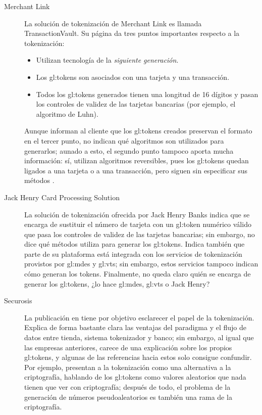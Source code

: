 \begin{description}
  \item[Merchant Link]
    La solución de tokenización de Merchant Link es llamada TransactionVault. Su
    página da tres puntos importantes respecto a la tokenización:
    \begin{itemize}
      \item Utilizan tecnología de la \textit{siguiente generación}.
      \item Los \glspl{gl:token} son asociados con una tarjeta y una
        transacción.
      \item Todos los \glspl{gl:token} generados tienen una longitud de 16
        dígitos y pasan los controles de validez de las tarjetas bancarias
        (por ejemplo, el algoritmo de Luhn).
      \end{itemize}
      Aunque informan al cliente que los \glspl{gl:token} creados preservan el
      formato en el tercer punto, no indican qué algoritmos son utilizados para
      generarlos; aunado a esto, el segundo punto tampoco aporta mucha
      información: sí, utilizan algoritmos reversibles, pues los
      \glspl{gl:token} quedan ligados a una tarjeta o a una transacción,
      pero siguen sin especificar sus métodos \cite{merchant_link}.

    \item[Jack Henry Card Processing Solution]
      La solución de tokenización ofrecida por Jack Henry Banks indica que se
      encarga de sustituir el número de tarjeta con un \gls{gl:token} numérico
      válido que pasa los controles de validez  de las tarjetas bancarias; sin
      embargo, no dice qué métodos utiliza para generar los \glspl{gl:token}.
      Indica también que parte de su plataforma está integrada con los servicios
      de tokenización provistos por \gls{gl:mdes} y \gls{gl:vts}; sin embargo,
      estos servicios tampoco indican cómo generan los tokens. Finalmente, no
      queda claro quién se encarga de generar los \glspl{gl:token}, ¿lo hace
      \gls{gl:mdes}, \gls{gl:vts} o Jack Henry?\cite{jack_henry, mdes_1, mdes_2}

    \item[Securosis]
      La publicación en \cite{securosis} tiene por objetivo esclarecer el papel
      de la tokenización. Explica de forma bastante clara las ventajas del
      paradigma y el flujo de datos entre tienda, sistema tokenizador y banco;
      sin embargo, al igual que las empresas anteriores, carece de una
      explicación sobre los propios \glspl{gl:token}, y algunas de las
      referencias hacia estos solo consigue confundir. Por ejemplo, presentan
      a la tokenización como una alternativa a la criptografía, hablando
      de los \glspl{gl:token} como valores aleatorios que nada tienen que
      ver con criptografía; después de todo, el problema de la generación
      de números pseudoaleatorios es también una rama de la criptografía.


\end{description}

